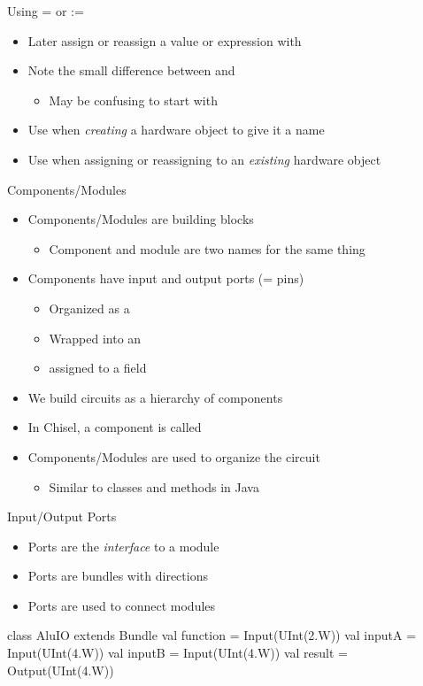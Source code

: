 \begin{frame}[fragile]{Using = or :=}
\begin{itemize}
\item Later assign or reassign a value or expression with \code{:=}
\end{itemize}
\begin{itemize}
\item Note the small difference between \code{=} and \code{:=}
\begin{itemize}
\item May be confusing to start with
\end{itemize}
\item Use \code{=} when \emph{creating} a hardware object to give it a name
\item Use \code{:=} when assigning or reassigning to an \emph{existing} hardware object
\end{itemize}
\end{frame}

\begin{frame}[fragile]{Components/Modules}
\begin{itemize}
\item Components/Modules are building blocks
\begin{itemize}
\item Component and module are two names for the same thing
\end{itemize}
\item Components have input and output ports (= pins)
\begin{itemize}
\item Organized as a 
\item Wrapped into an 
\item assigned to a field 
\end{itemize}
\item We build circuits as a hierarchy of components
\item In Chisel, a component is called 
\item Components/Modules are used to organize the circuit
\begin{itemize}
\item Similar to classes and methods in Java
\end{itemize}
\end{itemize}
\end{frame}


\begin{frame}[fragile]{Input/Output Ports}
\begin{itemize}
\item Ports are the \emph{interface} to a module
\item Ports are bundles with directions
\item Ports are used to connect modules
\end{itemize}
\begin{chisel}
class AluIO extends Bundle {
  val function = Input(UInt(2.W))
  val inputA = Input(UInt(4.W))
  val inputB = Input(UInt(4.W))
  val result = Output(UInt(4.W))
}
\end{chisel}
\end{frame}


